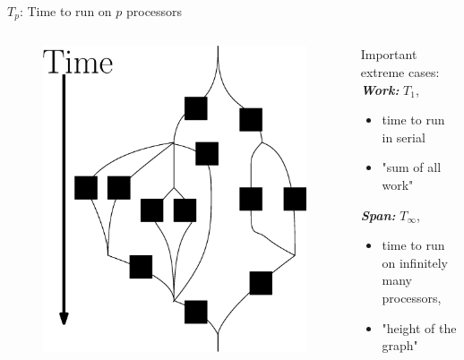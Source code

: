 \documentclass[xcolor=x11names, svgnames, rgb]{beamer}
\newcommand{\defn}[1]       {{\textit{\textbf{\boldmath #1}}}}
\begin{document}
\begin{frame}[t]{\defn{$T_p$}: Time to run on $p$ processors}
	\begin{columns}[T] %
	\begin{column}{.60\textwidth}
		\begin{figure}
			\includegraphics[width=0.8\linewidth]{imgs/altParallelForLoopComposition.eps}
		\end{figure}
	\end{column}
	\hfill
	\begin{column}{.45\textwidth}
		Important extreme cases:\\
		\vspace{0.3cm}
		\defn{Work:} $T_1$, 
		\begin{itemize}
			\item time to run in serial
			\item "sum of all work"
		\end{itemize}
		\vspace{0.3cm}
		\defn{Span:} $T_\infty$,
		\begin{itemize}
			\item time to run on infinitely many processors,\\ 
			\item "height of the graph"
		\end{itemize}	
	\end{column}
	\end{columns}
\end{frame}
\end{document}
